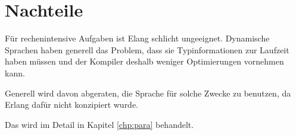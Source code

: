 \section{Nachteile}
Für rechenintensive Aufgaben ist Elang schlicht ungeeignet.
Dynamische Sprachen haben generell das Problem, dass sie
Typinformationen zur Laufzeit haben müssen und der Kompiler deshalb
weniger Optimierungen vornehmen kann.

Generell wird davon abgeraten, die Sprache für solche Zwecke zu
benutzen, da Erlang dafür nicht konzipiert wurde.
\cite[Kapitel~3]{lyse}

Das wird im Detail in Kapitel \ref{chp:para}
behandelt.
